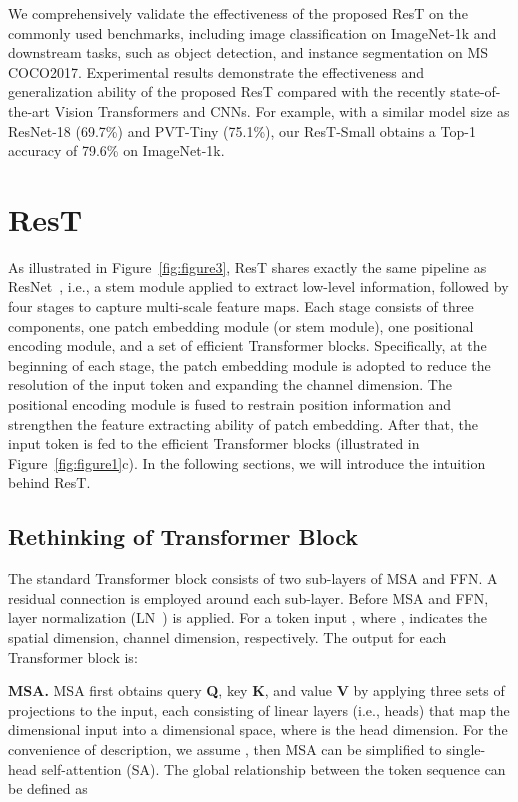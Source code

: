 \documentclass{article}
\begin{document}
We comprehensively validate the effectiveness of the proposed ResT on the commonly used benchmarks, including image classification on ImageNet-1k and downstream tasks, such as object detection, and instance segmentation on MS COCO2017.
Experimental results demonstrate the effectiveness and generalization ability of the proposed ResT compared with the recently state-of-the-art Vision Transformers and CNNs. For example, with a similar model size as ResNet-18 (69.7\%) and PVT-Tiny (75.1\%), our ResT-Small obtains a Top-1 accuracy of 79.6\% on ImageNet-1k.







\section{ResT}
\label{sec:rest}
As illustrated in Figure~\ref{fig:figure3}, ResT shares exactly the same pipeline as ResNet~\cite{DBLP:conf/cvpr/HeZRS16}, i.e., a stem module applied to extract low-level information, followed by four stages to capture multi-scale feature maps. Each stage consists of three components, one patch embedding module (or stem module), one positional encoding module, and a set of  efficient Transformer blocks. Specifically, at the beginning of each stage, the patch embedding module is adopted to reduce the resolution of the input token and expanding the channel dimension. The positional encoding module is fused to restrain position information and strengthen the feature extracting ability of patch embedding. After that, the input token is fed to the efficient Transformer blocks (illustrated in Figure~\ref{fig:figure1}c). In the following sections, we will introduce the intuition behind ResT.

\subsection{Rethinking of Transformer Block}
\label{sec:3.1}
The standard Transformer block consists of two sub-layers of MSA and FFN. A residual connection is employed around each sub-layer. Before MSA and FFN, layer normalization (LN~\cite{DBLP:journals/corr/BaKH16}) is applied. For a token input , where ,  indicates the spatial dimension, channel dimension, respectively. The output for each Transformer block is:


\textbf{MSA.} 
MSA first obtains query \textbf{Q}, key \textbf{K}, and value \textbf{V} by applying three sets of projections to the input, each consisting of  linear layers (i.e., heads) that map the  dimensional input into a  dimensional space, where  is the head dimension. For the convenience of description, we assume , then MSA can be simplified to single-head self-attention (SA). The global relationship between the token sequence can be defined as
\end{document}
